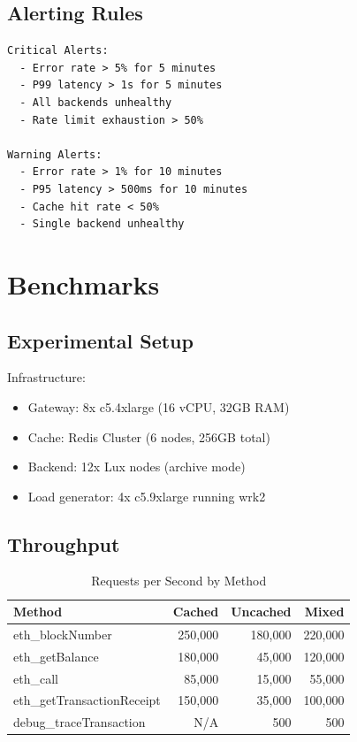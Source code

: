 \documentclass[11pt,a4paper]{article}
\begin{document}
\subsection{Alerting Rules}

\begin{lstlisting}
Critical Alerts:
  - Error rate > 5% for 5 minutes
  - P99 latency > 1s for 5 minutes
  - All backends unhealthy
  - Rate limit exhaustion > 50%

Warning Alerts:
  - Error rate > 1% for 10 minutes
  - P95 latency > 500ms for 10 minutes
  - Cache hit rate < 50%
  - Single backend unhealthy
\end{lstlisting}

\section{Benchmarks}

\subsection{Experimental Setup}

Infrastructure:
\begin{itemize}
    \item Gateway: 8x c5.4xlarge (16 vCPU, 32GB RAM)
    \item Cache: Redis Cluster (6 nodes, 256GB total)
    \item Backend: 12x Lux nodes (archive mode)
    \item Load generator: 4x c5.9xlarge running wrk2
\end{itemize}

\subsection{Throughput}

\begin{table}[htbp]
\centering
\caption{Requests per Second by Method}
\begin{tabular}{lrrr}
\toprule
\textbf{Method} & \textbf{Cached} & \textbf{Uncached} & \textbf{Mixed} \\
\midrule
eth\_blockNumber & 250,000 & 180,000 & 220,000 \\
eth\_getBalance & 180,000 & 45,000 & 120,000 \\
eth\_call & 85,000 & 15,000 & 55,000 \\
eth\_getTransactionReceipt & 150,000 & 35,000 & 100,000 \\
debug\_traceTransaction & N/A & 500 & 500 \\
\bottomrule
\end{tabular}
\label{tab:throughput}
\end{table}
\end{document}
